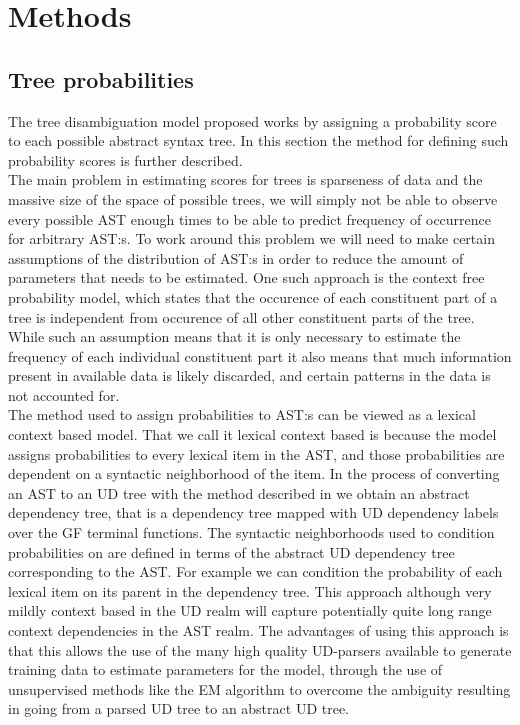 \chapter{Methods}

\section{Tree probabilities}
The tree disambiguation model proposed works by assigning a probability score to each possible abstract syntax tree. In this section the method for defining such probability scores is further described.\\
The main problem in estimating scores for trees is sparseness of data and the massive size of the space of possible trees, we will simply not be able to observe every possible AST enough times to be able to predict frequency of occurrence for arbitrary AST:s. To work around this problem we will need to make certain assumptions of the distribution of AST:s in order to reduce the amount of parameters that needs to be estimated. One such approach is the context free probability model, which states that the occurence of each constituent part of a tree is independent from occurence of all other constituent parts of the tree. While such an assumption means that it is only necessary to estimate the frequency of each individual constituent part it also means that much information present in available data is likely discarded, and certain patterns in the data is not accounted for. 
\\
The method used to assign probabilities to AST:s can be viewed as a lexical context based model. That we call it lexical context based is because the model assigns probabilities to every lexical item in the AST, and those probabilities are dependent on a syntactic neighborhood of the item. In the process of converting an AST to an UD tree with the method described in \citep{kolachina2016gf2ud} we obtain an abstract dependency tree, that is a dependency tree mapped with UD dependency labels over the GF terminal functions. The syntactic neighborhoods used to condition probabilities on are defined in terms of the abstract UD dependency tree corresponding to the AST. For example we can condition the probability of each lexical item on its parent in the dependency tree. This approach although very mildly context based in the UD realm will capture potentially quite long range context dependencies in the AST realm. The advantages of using this approach is that this allows the use of the many high quality UD-parsers available to generate training data to estimate parameters for the model, through the use of unsupervised methods like the EM algorithm to overcome the ambiguity resulting in going from a parsed UD tree to an abstract UD tree.

